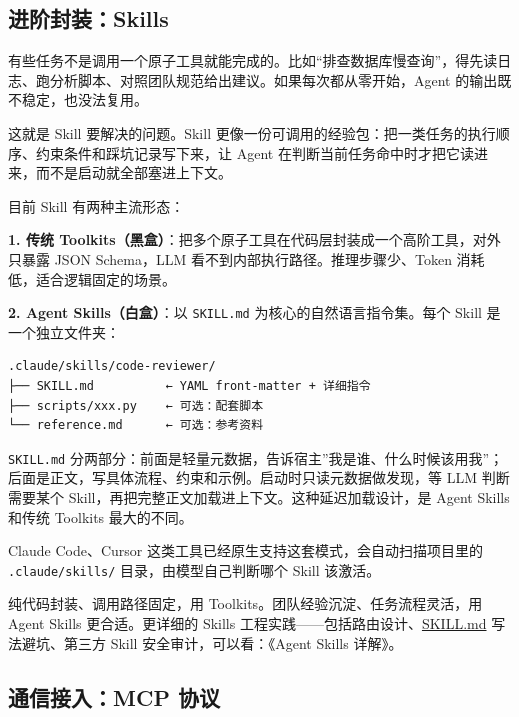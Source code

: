 \documentclass[10pt,a4paper]{ctexart}
\begin{document}
\subsection{进阶封装：Skills}


有些任务不是调用一个原子工具就能完成的。比如“排查数据库慢查询”，得先读日志、跑分析脚本、对照团队规范给出建议。如果每次都从零开始，Agent 的输出既不稳定，也没法复用。



这就是 Skill 要解决的问题。Skill 更像一份可调用的经验包：把一类任务的执行顺序、约束条件和踩坑记录写下来，让 Agent 在判断当前任务命中时才把它读进来，而不是启动就全部塞进上下文。



目前 Skill 有两种主流形态：



\textbf{1. 传统 Toolkits（黑盒）}：把多个原子工具在代码层封装成一个高阶工具，对外只暴露 JSON Schema，LLM 看不到内部执行路径。推理步骤少、Token 消耗低，适合逻辑固定的场景。



\textbf{2. Agent Skills（白盒）}：以 \texttt{SKILL.md} 为核心的自然语言指令集。每个 Skill 是一个独立文件夹：



\begin{lstlisting}
.claude/skills/code-reviewer/
├── SKILL.md          ← YAML front-matter + 详细指令
├── scripts/xxx.py    ← 可选：配套脚本
└── reference.md      ← 可选：参考资料
\end{lstlisting}



\texttt{SKILL.md} 分两部分：前面是轻量元数据，告诉宿主”我是谁、什么时候该用我”；后面是正文，写具体流程、约束和示例。启动时只读元数据做发现，等 LLM 判断需要某个 Skill，再把完整正文加载进上下文。这种延迟加载设计，是 Agent Skills 和传统 Toolkits 最大的不同。



Claude Code、Cursor 这类工具已经原生支持这套模式，会自动扫描项目里的 \texttt{.claude/skills/} 目录，由模型自己判断哪个 Skill 该激活。



纯代码封装、调用路径固定，用 Toolkits。团队经验沉淀、任务流程灵活，用 Agent Skills 更合适。更详细的 Skills 工程实践——包括路由设计、\href{http://skill.md/}{SKILL.md} 写法避坑、第三方 Skill 安全审计，可以看：《Agent Skills 详解》。



\subsection{通信接入：MCP 协议}
\end{document}
